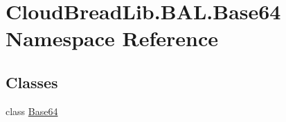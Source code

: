 \hypertarget{namespace_cloud_bread_lib_1_1_b_a_l_1_1_base64}{}\section{Cloud\+Bread\+Lib.\+B\+A\+L.\+Base64 Namespace Reference}
\label{namespace_cloud_bread_lib_1_1_b_a_l_1_1_base64}
\subsection*{Classes}
\begin{DoxyCompactItemize}
\item 
class \hyperlink{class_cloud_bread_lib_1_1_b_a_l_1_1_base64_1_1_base64}{Base64}
\end{DoxyCompactItemize}
